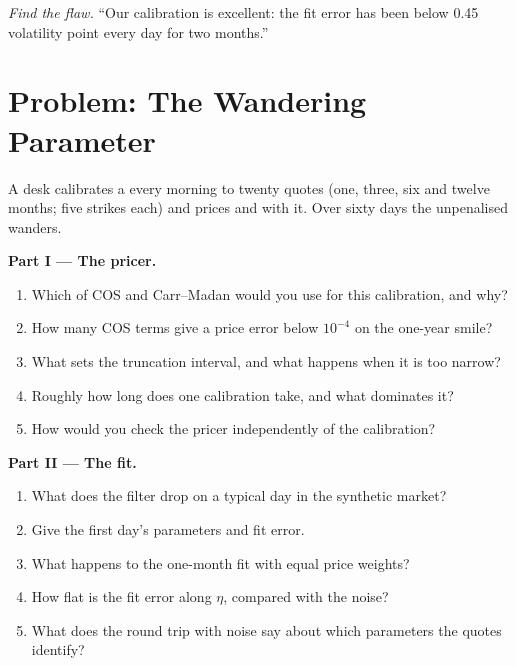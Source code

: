 \begin{exercise}[$\star\star\star$]\label{exo:dv:fourier-pricing-and-calibration-engineering:8}
\emph{Find the flaw.} ``Our calibration is excellent: the fit error has been below 0.45 volatility point every day for two months.''
\end{exercise}

\section{Problem: The Wandering Parameter}

\begin{problem}\label{pb:dv:fourier-pricing-and-calibration-engineering:1}
A desk calibrates a  every morning to twenty quotes (one, three, six and twelve months; five strikes each) and prices 
and  with it. Over sixty days the unpenalised  wanders.

\medskip\noindent\textbf{Part I --- The pricer.}
\begin{enumerate}
\item Which of COS and Carr--Madan would you use for this calibration, and why?
\item How many COS terms give a price error below $10^{-4}$ on the one-year smile?
\item What sets the truncation interval, and what happens when it is too narrow?
\item Roughly how long does one calibration take, and what dominates it?
\item How would you check the pricer independently of the calibration?
\end{enumerate}

\medskip\noindent\textbf{Part II --- The fit.}
\begin{enumerate}[resume]
\item What does the filter drop on a typical day in the synthetic market?
\item Give the first day's parameters and fit error.
\item What happens to the one-month fit with equal price weights?
\item How flat is the fit error along $\eta$, compared with the noise?
\item What does the round trip with noise say about which parameters the quotes identify?
\end{enumerate}


\end{problem}
